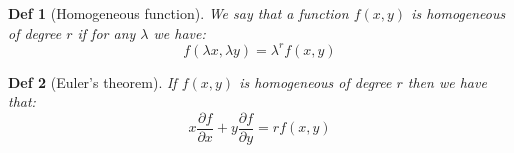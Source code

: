 \documentclass[11pt,a4paper, margin]{article}
\theoremstyle{break}
\theoremstyle{break}
\newtheorem*{definition}{Def}
\begin{document}
\begin{definition}[Homogeneous function]
We say that a function $f(x,y)$ is homogeneous of degree $r$ if for any $\lambda$ we have: \[f(\lambda x, \lambda y) = \lambda^r f(x,y)\]
\end{definition}

\begin{definition} [Euler's theorem]
If $f(x,y)$ is homogeneous of degree $r$ then we have that:
\[x\dfrac{\partial f}{\partial x} + y\dfrac{\partial f}{\partial y} = rf(x,y)\]
\end{definition}
\end{document}
